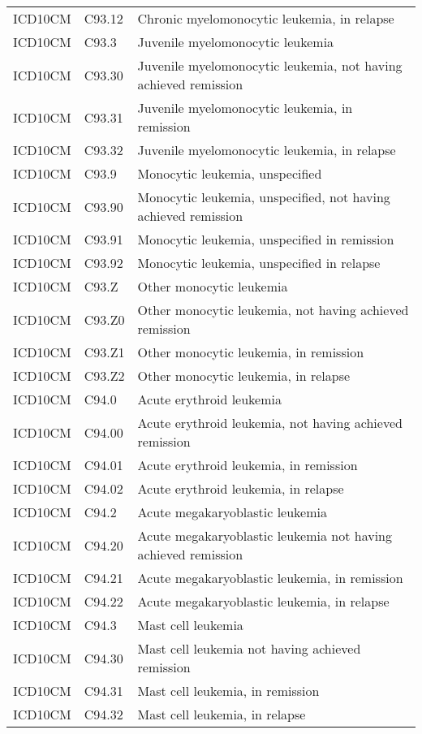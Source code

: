 \begin{table}[ht]
\begin{tabular}{lll}
  ICD10CM & C93.12 & Chronic myelomonocytic leukemia, in relapse \\ 
  ICD10CM & C93.3 & Juvenile myelomonocytic leukemia \\ 
  ICD10CM & C93.30 & Juvenile myelomonocytic leukemia, not having achieved remission \\ 
  ICD10CM & C93.31 & Juvenile myelomonocytic leukemia, in remission \\ 
  ICD10CM & C93.32 & Juvenile myelomonocytic leukemia, in relapse \\ 
  ICD10CM & C93.9 & Monocytic leukemia, unspecified \\ 
  ICD10CM & C93.90 & Monocytic leukemia, unspecified, not having achieved remission \\ 
  ICD10CM & C93.91 & Monocytic leukemia, unspecified in remission \\ 
  ICD10CM & C93.92 & Monocytic leukemia, unspecified in relapse \\ 
  ICD10CM & C93.Z & Other monocytic leukemia \\ 
  ICD10CM & C93.Z0 & Other monocytic leukemia, not having achieved remission \\ 
  ICD10CM & C93.Z1 & Other monocytic leukemia, in remission \\ 
  ICD10CM & C93.Z2 & Other monocytic leukemia, in relapse \\ 
  ICD10CM & C94.0 & Acute erythroid leukemia \\ 
  ICD10CM & C94.00 & Acute erythroid leukemia, not having achieved remission \\ 
  ICD10CM & C94.01 & Acute erythroid leukemia, in remission \\ 
  ICD10CM & C94.02 & Acute erythroid leukemia, in relapse \\ 
  ICD10CM & C94.2 & Acute megakaryoblastic leukemia \\ 
  ICD10CM & C94.20 & Acute megakaryoblastic leukemia not having achieved remission \\ 
  ICD10CM & C94.21 & Acute megakaryoblastic leukemia, in remission \\ 
  ICD10CM & C94.22 & Acute megakaryoblastic leukemia, in relapse \\ 
  ICD10CM & C94.3 & Mast cell leukemia \\ 
  ICD10CM & C94.30 & Mast cell leukemia not having achieved remission \\ 
  ICD10CM & C94.31 & Mast cell leukemia, in remission \\ 
  ICD10CM & C94.32 & Mast cell leukemia, in relapse \\ 

\end{tabular}
\end{table}
